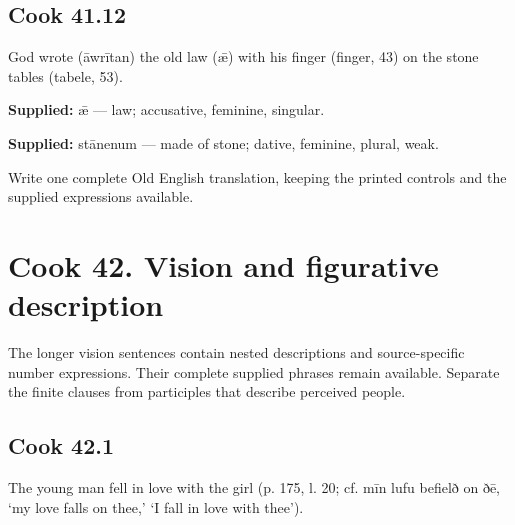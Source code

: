 \par\begin{minipage}{\linewidth}\raggedright
\subsection*{Cook 41.12}

God wrote (āwrītan) the old law (ǣ) with his finger (finger, 43) on the stone tables (tabele, 53).

\end{minipage}\par\addvspace{4pt}

\textbf{Supplied:} ǣ — law; accusative, feminine, singular.

\textbf{Supplied:} stānenum — made of stone; dative, feminine, plural, weak.

Write one complete Old English translation, keeping the printed controls and the supplied expressions available.

\section*{Cook 42. Vision and figurative description}

The longer vision sentences contain nested descriptions and source-specific number expressions. Their complete supplied phrases remain available. Separate the finite clauses from participles that describe perceived people.

\par\begin{minipage}{\linewidth}\raggedright
\subsection*{Cook 42.1}

The young man fell in love with the girl (p. 175, l. 20; cf. mīn lufu befielð on ðē, ‘my love falls on thee,’ ‘I fall in love with thee’).

\end{minipage}\par\addvspace{4pt}

